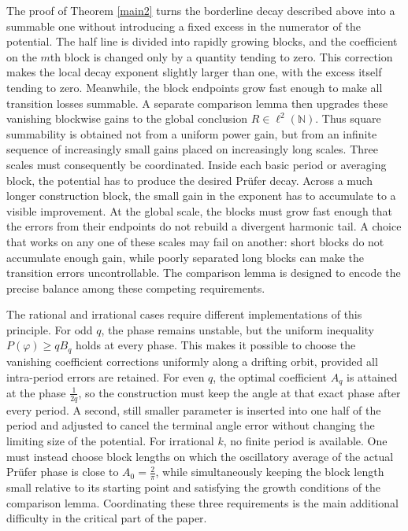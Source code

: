 \documentclass[12pt]{amsart}
\theoremstyle{plain}
\theoremstyle{definition}
\begin{document}
The proof of Theorem \ref{main2} turns the borderline decay described
above into a summable one without introducing a fixed excess in the numerator of the
potential.  The half line is divided into rapidly growing blocks, and
the coefficient on the $m$th block is changed only by a quantity
tending to zero.  This correction makes the local decay exponent
slightly larger than one, with the excess itself tending to zero.
Meanwhile, the block endpoints grow fast enough to make all
transition losses summable.  A separate comparison lemma then
upgrades these vanishing blockwise gains to the global conclusion
$R\in\ell^2(\mathbb N)$.  Thus square summability is obtained not from
a uniform power gain, but from an infinite sequence of increasingly
small gains placed on increasingly long scales.
Three scales must consequently be coordinated.  Inside each basic
period or averaging block, the potential has to produce the desired
Pr\"ufer decay.  Across a much longer construction block, the small
gain in the exponent has to accumulate to a visible improvement.  At
the global scale, the blocks must grow fast enough that the errors
from their endpoints do not rebuild a divergent harmonic tail.  A
choice that works on any one of these scales may fail on another:
short blocks do not accumulate enough gain, while poorly separated
long blocks can make the transition errors uncontrollable.  The
comparison lemma is designed to encode the precise balance among
these competing requirements.

The rational and irrational cases require different implementations of this principle.  For odd $q$, the phase remains unstable, but the uniform
inequality $P(\varphi)\geq qB_q$ holds at every phase.  This makes it
possible to choose the vanishing coefficient corrections uniformly
along a drifting orbit, provided all intra-period errors are retained.
For even $q$, the optimal coefficient $A_q$ is attained at the phase
$\frac{1}{2q}$, so the construction must keep the angle at that exact phase
after every period.  A second, still smaller parameter is inserted
into one half of the period and adjusted to cancel the terminal angle
error without changing the limiting size of the potential.  For
irrational $k$, no finite period is available.  One must instead
choose block lengths on which the oscillatory average of the actual
Pr\"ufer phase is close to $A_0=\frac{2}{\pi}$, while simultaneously keeping
the block length small relative to its starting point and satisfying
the growth conditions of the comparison lemma.  Coordinating these
three requirements is the main additional difficulty in the critical
part of the paper.
\end{document}
